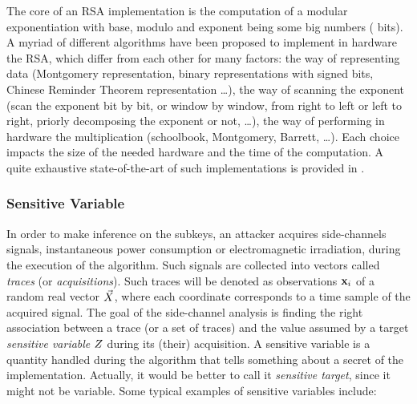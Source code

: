 \begin{remark}
The core of an RSA implementation is the computation of a modular exponentiation with base, modulo and exponent being some big numbers ( bits). A myriad of different algorithms have been proposed to implement in hardware the RSA, which differ from each other for many factors: the way of representing data (\eg Montgomery representation, binary representations with signed bits, Chinese Reminder Theorem representation \dots), the way of scanning the exponent (\eg scan the exponent bit by bit, or window by window, from right to left or left to right, priorly decomposing the exponent or not, \dots), the way of performing in hardware the multiplication (\eg schoolbook, Montgomery, Barrett, \dots). Each choice impacts the size of the needed hardware and the time of the computation. A quite exhaustive state-of-the-art of such implementations is provided in \cite{koc1994high}. 
\end{remark}

\subsubsection{Sensitive Variable}\label{sec:sensVar}
In order to make inference on the subkeys, an attacker acquires side-channels signals, \eg instantaneous power consumption or electromagnetic irradiation, during the execution of the algorithm. Such signals are collected into vectors called \emph{traces} (or \emph{acquisitions}). Such traces will be denoted as observations $\textbf{x}_i$ of a random real vector $\vec{X}$, where each coordinate corresponds to a time sample of the acquired signal. The goal of the side-channel analysis is finding the right association between a trace (or a set of traces) and the value assumed by a target \emph{sensitive variable} $Z$ during its (their) acquisition. A sensitive variable is a quantity handled during the algorithm that tells something about a secret of the implementation. Actually, it would be better to call it \emph{sensitive target}, since it might not be variable. Some typical examples of sensitive variables include: 



